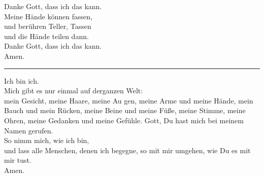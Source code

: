  Danke Gott, dass ich das kann.\\ \newline
Meine Hände können fassen,\\
und berühren Teller, Tassen\\
und die Hände teilen dann.\\
Danke Gott, dass ich das kann.\\ \newline
Amen.\\
\par\noindent\rule{\textwidth}{0.4pt} \newline \newline
Ich bin ich.\\
Mich gibt es nur einmal auf derganzen Welt:\\
mein Gesicht, meine Haare, meine Au gen, meine Arme und meine Hände, mein\\
Bauch und mein Rücken,  meine Beine und meine Füße,  meine Stimme, meine\\
Ohren,  meine Gedanken und meine Gefühle.  Gott, Du hast mich bei meinem\\
Namen gerufen.\\
So nimm mich, wie ich bin, \\
und lass alle Menschen, denen ich begegne, so mit mir umgehen, wie Du es mit\\
mir tust. \\ \newline
Amen.\\
\newpage